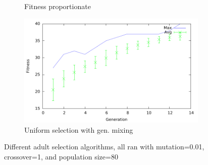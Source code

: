 \begin{figure}[H]
\begin{subfigure}[b]{0.5\textwidth}
                \caption{Fitness proportionate}
                \label{fig:fp}
        \end{subfigure}%
        \begin{subfigure}[b]{0.5\textwidth}
                \includegraphics[width=\textwidth]{../results/other-functions/uniform-80-001.pdf}
                \caption{Uniform selection with gen. mixing}
                \label{fig:uniform}
        \end{subfigure}
        \caption{Different adult selection algorithms, all ran with mutation=0.01, crossover=1, and population size=80}
        \label{fig:fgp-fp-fitness-graphs}
\end{figure}